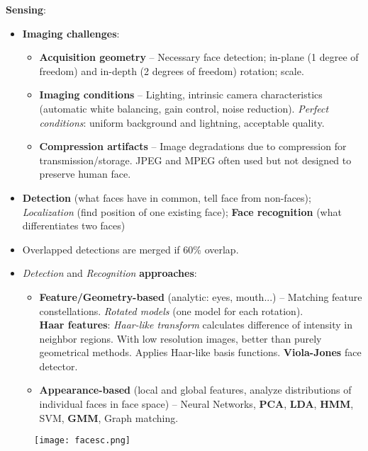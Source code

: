 \documentclass[a4paper]{article}
\begin{document}
      \textbf{Sensing}:
      \begin{itemize}
        \item \textbf{Imaging challenges}:
        \begin{itemize}
          \item \textbf{Acquisition geometry} -- Necessary face detection; in-plane (1 degree of freedom) and in-depth (2 degrees of freedom) rotation; scale.
          \item \textbf{Imaging conditions} -- Lighting, intrinsic camera characteristics (automatic white balancing, gain control, noise reduction). \emph{Perfect conditions}: uniform background and lightning, acceptable quality.
          \item \textbf{Compression artifacts} -- Image degradations due to compression for transmission/storage. JPEG and MPEG often used but not designed to preserve human face.
        \end{itemize}
        \item \textbf{Detection} (what faces have in common, tell face from non-faces); \emph{Localization} (find position of one existing face); \textbf{Face recognition} (what differentiates two faces)
        \item Overlapped detections are merged if 60\% overlap.
        \item \emph{Detection} and \emph{Recognition} \textbf{approaches}:
        \begin{itemize}
          \item \textbf{Feature/Geometry-based} (analytic: eyes, mouth...) -- Matching feature constellations. \emph{Rotated models} (one model for each rotation).\\
          \textbf{Haar features}: \emph{Haar-like transform} calculates difference of intensity in neighbor regions. With low resolution images, better than purely geometrical methods. Applies Haar-like basis functions. \textbf{Viola-Jones} face detector.
          \item \textbf{Appearance-based} (local and global features, analyze distributions of individual faces in face space) -- Neural Networks, \textbf{PCA}, \textbf{LDA}, \textbf{HMM}, SVM, \textbf{GMM}, Graph matching.
        \end{itemize}
      \end{itemize}
        \begin{figure}[htp]
          \centering
            \texttt{[image: facesc.png]}
        \end{figure}
\end{document}
